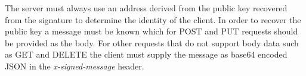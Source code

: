 \documentclass[a4paper,titlepage,oneside]{article}
\renewcommand{\paragraph}{\small}
\begin{document}
\paragraph{The server must always use an address derived from the public key recovered from the signature to determine the identity of the client. In order to recover the public key a message must be known which for POST and PUT requests should be provided as the body. For other requests that do not support body data such as GET and DELETE the client must supply the message as base64 encoded JSON in the \emph{x-signed-message} header.}
\end{document}
